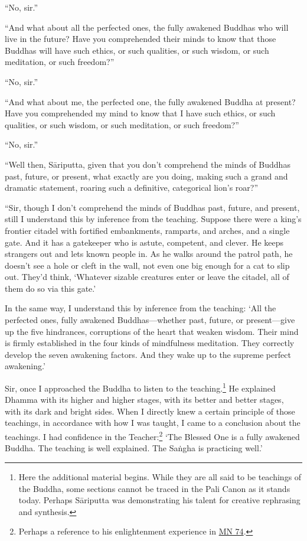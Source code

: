 \documentclass[12pt,openany]{book}%
\begin{document}
“No, sir.” 

“And what about all the perfected ones, the fully awakened Buddhas who will live in the future? Have you comprehended their minds to know that those Buddhas will have such ethics, or such qualities, or such wisdom, or such meditation, or such freedom?” 

“No, sir.” 

“And what about me, the perfected one, the fully awakened Buddha at present? Have you comprehended my mind to know that I have such ethics, or such qualities, or such wisdom, or such meditation, or such freedom?” 

“No, sir.” 

“Well then, \textsanskrit{Sāriputta}, given that you don’t comprehend the minds of Buddhas past, future, or present, what exactly are you doing, making such a grand and dramatic statement, roaring such a definitive, categorical lion’s roar?” 

“Sir, though I don’t comprehend the minds of Buddhas past, future, and present, still I understand this by inference from the teaching. Suppose there were a king’s frontier citadel with fortified embankments, ramparts, and arches, and a single gate. And it has a gatekeeper who is astute, competent, and clever. He keeps strangers out and lets known people in. As he walks around the patrol path, he doesn’t see a hole or cleft in the wall, not even one big enough for a cat to slip out. They’d think, ‘Whatever sizable creatures enter or leave the citadel, all of them do so via this gate.’ 

In the same way, I understand this by inference from the teaching: ‘All the perfected ones, fully awakened Buddhas—whether past, future, or present—give up the five hindrances, corruptions of the heart that weaken wisdom. Their mind is firmly established in the four kinds of mindfulness meditation. They correctly develop the seven awakening factors. And they wake up to the supreme perfect awakening.’ 

Sir, once I approached the Buddha to listen to the teaching.\footnote{Here the additional material begins. While they are all said to be teachings of the Buddha, some sections cannot be traced in the Pali Canon as it stands today. Perhaps \textsanskrit{Sāriputta} was demonstrating his talent for creative rephrasing and synthesis. } He explained Dhamma with its higher and higher stages, with its better and better stages, with its dark and bright sides. When I directly knew a certain principle of those teachings, in accordance with how I was taught, I came to a conclusion about the teachings. I had confidence in the Teacher:\footnote{Perhaps a reference to his enlightenment experience in \href{https://suttacentral.net/mn74/en/sujato}{MN 74}. } ‘The Blessed One is a fully awakened Buddha. The teaching is well explained. The \textsanskrit{Saṅgha} is practicing well.’ 
\end{document}
